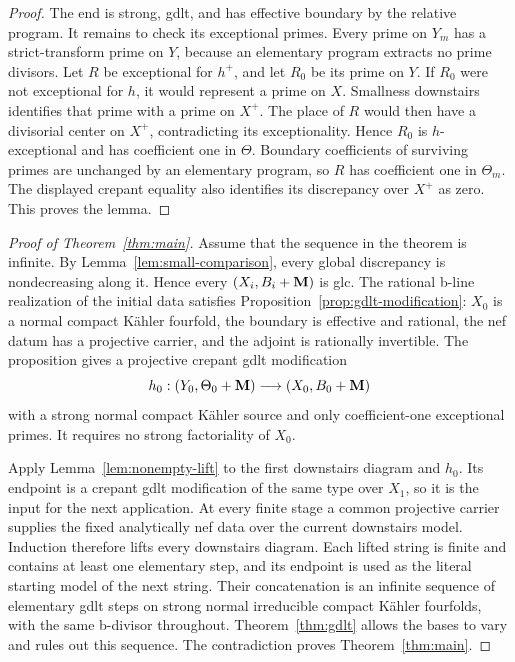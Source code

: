 \begin{proof}
The end is strong, gdlt, and has effective boundary by the relative
program.  It remains to check its exceptional primes.  Every prime on
\(Y_m\) has a strict-transform prime on \(Y\), because an elementary
program extracts no prime divisors.  Let \(R\) be exceptional for
\(h^+\), and let \(R_0\) be its prime on \(Y\).  If \(R_0\) were not
exceptional for \(h\), it would represent a prime on \(X\).  Smallness
downstairs identifies that prime with a prime on \(X^+\).  The place of
\(R\) would then have a divisorial center on \(X^+\), contradicting its
exceptionality.  Hence \(R_0\) is \(h\)-exceptional and has coefficient
one in \(\Theta\).  Boundary coefficients of surviving primes are
unchanged by an elementary program, so \(R\) has coefficient one in
\(\Theta_m\).  The displayed crepant equality also identifies its
discrepancy over \(X^+\) as zero.  This proves the lemma.
\end{proof}

\begin{proof}[Proof of Theorem~\ref{thm:main}]
Assume that the sequence in the theorem is infinite.  By
Lemma~\ref{lem:small-comparison}, every global discrepancy is nondecreasing
along it.  Hence every \((X_i,B_i+\mathbf{M})\) is glc.  The rational b-line
realization of the initial data satisfies
Proposition~\ref{prop:gdlt-modification}: \(X_0\) is a normal compact
K\"ahler fourfold, the boundary is effective and rational, the nef datum
has a projective carrier, and the adjoint is rationally invertible.  The
proposition gives a projective crepant gdlt modification
\[
 h_0:(Y_0,\Theta_0+\mathbf{M})\longrightarrow(X_0,B_0+\mathbf{M})
\]
with a strong normal compact K\"ahler source and only coefficient-one
exceptional primes.  It requires no strong factoriality of \(X_0\).

Apply Lemma~\ref{lem:nonempty-lift} to the first downstairs diagram and
\(h_0\).  Its endpoint is a crepant gdlt modification of the same type over
\(X_1\), so it is the input for the next application.  At every finite
stage a common projective carrier supplies the fixed analytically nef
data over the current downstairs model.  Induction therefore lifts every
downstairs diagram.  Each lifted string is finite and contains at least one
elementary step, and its endpoint is used as the literal starting model of
the next string.  Their concatenation is an infinite sequence of elementary
gdlt steps on strong normal irreducible compact K\"ahler fourfolds, with the same
b-divisor throughout.  Theorem~\ref{thm:gdlt} allows the bases to vary and
rules out this sequence.  The contradiction proves
Theorem~\ref{thm:main}.
\end{proof}
